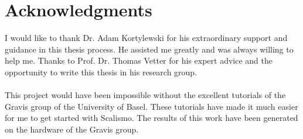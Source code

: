 \chapter{Acknowledgments}
I would like to thank Dr. Adam Kortylewski for his extraordinary support and guidance in this thesis process. He assisted me greatly and was always willing to help me. Thanks to Prof. Dr. Thomas Vetter for his expert advice and the opportunity to write this thesis in his research group.\\
\\
This project would have been impossible without the excellent tutorials of the Gravis group of the University of Basel. These tutorials have made it much easier for me to get started with Scalismo. The results of this work have been generated on the hardware of the Gravis group.

